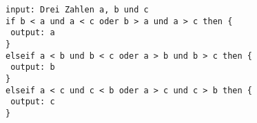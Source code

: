 %
%
\begin{minipage}{\linewidth}
\begin{lstlisting}[language=pseudocode, caption={Algorithmus für das Problem \protect\autoref{problem-median-3-zahlen}}]
input: Drei Zahlen a, b und c
if b < a und a < c oder b > a und a > c then {
 output: a
}
elseif a < b und b < c oder a > b und b > c then {
 output: b
}
elseif a < c und c < b oder a > c und c > b then {
 output: c
}
\end{lstlisting}
\end{minipage}
\vfill
